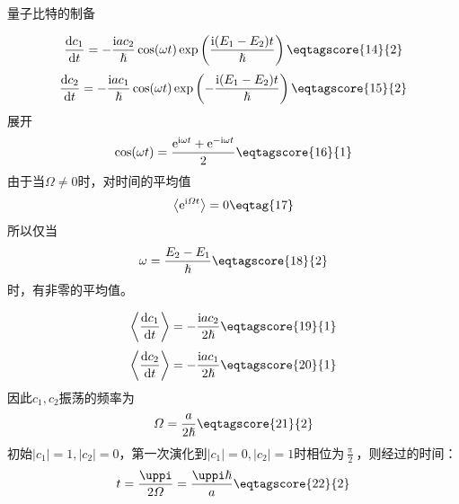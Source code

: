 \documentclass[answer]{cphos}
\begin{document}
\begin{problem}[50]{量子比特的制备}
\begin{solution}
\begin{equation}
	\frac{\mathrm{d}c_1}{\mathrm{d}t}=-\frac{\mathrm{i}ac_2}{\hslash}\cos(\omega t)\exp\left(\frac{\mathrm{i}(E_1-E_2)t}{\hslash}\right)
	\eqtagscore{14}{2}
\end{equation}
\begin{equation}
	\frac{\mathrm{d}c_2}{\mathrm{d}t}=-\frac{\mathrm{i}ac_1}{\hslash}\cos(\omega t)\exp\left(-\frac{\mathrm{i}(E_1-E_2)t}{\hslash}\right)
	\eqtagscore{15}{2}
\end{equation}
展开
\begin{equation}
	\cos(\omega t)=\frac{\mathrm{e}^{\mathrm{i}\omega t}+\mathrm{e}^{-\mathrm{i}\omega t}}{2} \eqtagscore{16}{1}
\end{equation}
由于当$\varOmega\neq0$时，对时间的平均值
\begin{equation}
	\left\langle\mathrm{e}^{\mathrm{i}\varOmega t}\right\rangle=0
	\eqtag{17}
\end{equation}
所以仅当
\begin{equation}
	\omega=\frac{E_2-E_1}{\hslash} 	\eqtagscore{18}{2}
\end{equation}
时，有非零的平均值。

\begin{equation}
	\left\langle\frac{\mathrm{d}c_1}{\mathrm{d}t}\right\rangle=-\frac{\mathrm{i}ac_2}{2\hslash}
	\eqtagscore{19}{1}
\end{equation}
\begin{equation}
	\left\langle\frac{\mathrm{d}c_2}{\mathrm{d}t}\right\rangle=-\frac{\mathrm{i}ac_1}{2\hslash}
	\eqtagscore{20}{1}
\end{equation}
因此$c_1, c_2$振荡的频率为
\begin{equation}
	\varOmega=\frac{a}{2\hslash} \eqtagscore{21}{2}
\end{equation}
初始$|c_1|=1, |c_2|=0$，第一次演化到$|c_1|=0, |c_2|=1$时相位为$\frac{\uppi}{2}$，则经过的时间：
\begin{equation}
	t=\frac{\uppi}{2\varOmega}=\frac{\uppi\hslash}{a} \eqtagscore{22}{2}
\end{equation}


\scoring  %
\end{solution}

\end{problem}
\end{document}
